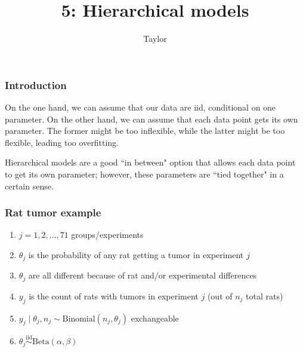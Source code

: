 \documentclass{beamer}
\title["5"]{5: Hierarchical models}
\author{Taylor}
\institute[UVA] 
{
University of Virginia \\
\medskip
\textit{} 
}
\date{}
\begin{document}

\begin{frame}
\titlepage 
\end{frame}

\begin{frame}
\frametitle{Introduction}

On the one hand, we can assume that our data are iid, conditional on one parameter. On the other hand, we can assume that each data point gets its own parameter. The former might be too inflexible, while the latter might be too flexible, leading too overfitting.
\newline

Hierarchical models are a good ``in between" option that allows each data point to get its own parameter; however, these parameters are ``tied together" in a certain sense.

\end{frame}

\begin{frame}
\frametitle{Rat tumor example}

\begin{enumerate}
\item $j=1,2,\ldots,71$ groups/experiments
\item $\theta_j$ is the probability of any rat getting a tumor in experiment $j$
\item $\theta_j$ are all different because of rat and/or experimental differences
\item $y_j$ is the count of rats with tumors in experiment $j$ (out of $n_j$ total rats)
\item $y_j \mid \theta_j, n_j \sim \text{Binomial}(n_j, \theta_j)$ exchangeable
\item $\theta_j \overset{\text{iid}}{\sim} \text{Beta}(\alpha,\beta)$ 
\end{enumerate}

\end{frame}
\end{document}
